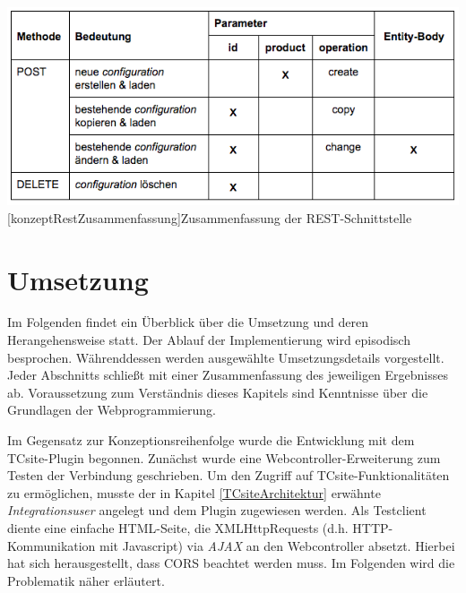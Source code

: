 \documentclass[11pt, a4paper, titlepage, listof=totoc, bibliography=totoc, index=totoc, twoside, openright, headings=normal, draft]{scrreprt}
\begin{document}
\vspace{1em}
\begin{minipage}{\linewidth}
	\centering
	\includegraphics[width=1\linewidth]{Abbildungen/konzeptRestZusammenfassung.png}
	[konzeptRestZusammenfassung]{Zusammenfassung der REST-Schnittstelle}
	\label{fig:konzeptRestZusammenfassung}
\end{minipage}
\vspace{1em}

\pagebreak

\section{Umsetzung}
\label{section:Umsetzung}
Im Folgenden findet ein Überblick über die Umsetzung und deren Herangehensweise statt. Der Ablauf der Implementierung wird episodisch besprochen. Währenddessen werden ausgewählte Umsetzungsdetails vorgestellt. Jeder Abschnitts schließt mit einer Zusammenfassung des jeweiligen Ergebnisses ab. Voraussetzung zum Verständnis dieses Kapitels sind Kenntnisse über die Grundlagen der Webprogrammierung.

Im Gegensatz zur Konzeptionsreihenfolge wurde die Entwicklung mit dem TCsite-Plugin begonnen. Zunächst wurde eine Webcontroller-Erweiterung zum Testen der Verbindung geschrieben. Um den Zugriff auf TCsite-Funktionalitäten zu ermöglichen, musste der in Kapitel \ref{TCsiteArchitektur} erwähnte \emph{Integrationsuser} angelegt und dem Plugin zugewiesen werden. Als Testclient diente eine einfache HTML-Seite, die XMLHttpRequests (d.h. HTTP-Kommunikation mit Javascript) via  \emph{AJAX} an den Webcontroller absetzt. Hierbei hat sich herausgestellt, dass  \ac{CORS} beachtet werden muss. Im Folgenden wird die Problematik näher erläutert.
\end{document}
